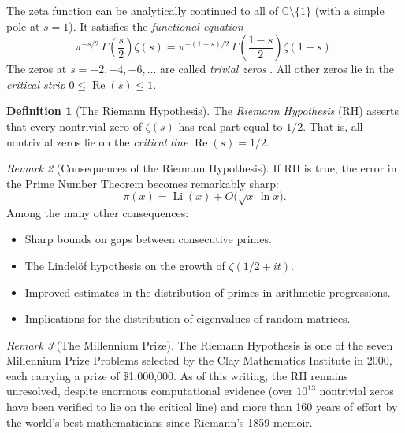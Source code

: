 \documentclass[12pt,a4paper,openany]{book}
\theoremstyle{definition}
\newtheorem{definition}{Definition}[chapter]
\theoremstyle{plain}
\theoremstyle{remark}
\newtheorem{remark}[definition]{Remark}
\newcommand{\C}{\mathbb{C}}
\begin{document}
The zeta function can be analytically continued
to all of $\C \setminus \{1\}$ (with a simple pole at $s=1$). It satisfies
the \emph{functional equation}
\[
  \pi^{-s/2}\,\Gamma\!\left(\frac{s}{2}\right)\zeta(s)
  = \pi^{-(1-s)/2}\,\Gamma\!\left(\frac{1-s}{2}\right)\zeta(1-s).
\]
The zeros at $s = -2, -4, -6, \ldots$ are called \emph{trivial zeros}%
. All other zeros lie in the
\emph{critical strip} $0 \leq \operatorname{Re}(s) \leq 1$.

\begin{definition}[The Riemann Hypothesis]
\label{def:RH}
The \emph{Riemann Hypothesis} (RH) asserts
that every nontrivial zero of $\zeta(s)$ has real part equal to $1/2$. That is,
all nontrivial zeros lie on the \emph{critical line}
$\operatorname{Re}(s) = 1/2$.
\end{definition}

\begin{remark}[Consequences of the Riemann Hypothesis]
\label{rem:RH-consequences}
If RH is true, the error in the Prime Number Theorem becomes remarkably sharp:
\[
  \pi(x) = \operatorname{Li}(x) + O\bigl(\sqrt{x}\,\ln x\bigr).
\]
Among the many other consequences:
\begin{itemize}
  \item Sharp bounds on gaps between consecutive primes.
  \item The Lindelöf hypothesis on the growth of
    $\zeta(1/2+it)$.
  \item Improved estimates in the distribution of primes in arithmetic
    progressions.
  \item Implications for the distribution of eigenvalues of random
    matrices.
\end{itemize}
\end{remark}

\begin{remark}[The Millennium Prize]
\label{rem:millennium}
The Riemann Hypothesis is one of the seven Millennium Prize
Problems selected by the Clay Mathematics
Institute in 2000, each carrying a prize of \$1{,}000{,}000. As of this
writing, the RH remains unresolved, despite enormous computational
evidence (over $10^{13}$ nontrivial
zeros have been verified to lie on the critical line) and more than 160 years
of effort by the world's best mathematicians since Riemann's 1859 memoir.
\end{remark}
\end{document}
